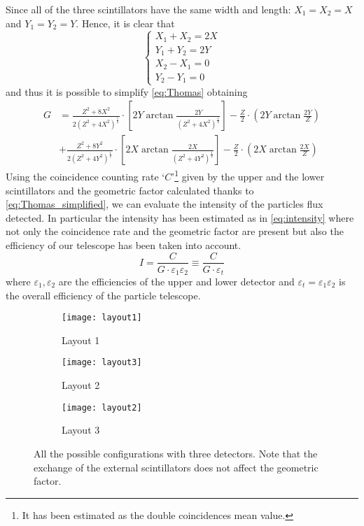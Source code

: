 Since all of the three scintillators have the same width and length: $X_1 = X_2 = X$ and $Y_1 = Y_2 = Y$. Hence, it is clear that
\begin{equation}
	\begin{cases}\label{eq:condG_simplified}
		X_1 + X_2 = 2X \\
		Y_1 + Y_2 = 2Y \\
		X_2 - X_1 = 0 \\
		Y_2 - Y_1 = 0
	\end{cases}
\end{equation}
and thus it is possible to simplify \eqref{eq:Thomas} obtaining
\begin{align}\label{eq:Thomas_simplified}
	G & = \frac{Z^2 + 8X^2}{2\left( Z^2 + 4X^2 \right) ^{\frac{1}{2}}} \cdot \left[ 2Y\arctan\frac{2Y}{\left( Z^2 + 4X^2 \right)^{\frac{1}{2}}} \right]
	- \frac{Z}{2} \cdot \left( 2Y\arctan\frac{2Y}{Z} \right) \nonumber \\
	& + \frac{Z^2 + 8Y^2}{2\left( Z^2 + 4Y^2 \right) ^{\frac{1}{2}}} \cdot \left[ 2X\arctan\frac{2X}{\left( Z^2 + 4Y^2 \right)^{\frac{1}{2}}} \right]
	- \frac{Z}{2} \cdot \left( 2X\arctan\frac{2X}{Z} \right)
\end{align}
Using the coincidence counting rate `$C$'\footnote{It has been estimated as the double coincidences mean value.} given by the upper and the lower scintillators and the geometric factor calculated thanks to \eqref{eq:Thomas_simplified}, we can evaluate the intensity of the particles flux detected. In particular the intensity has been estimated as in \eqref{eq:intensity} where not only the coincidence rate and the geometric factor are present but also the efficiency of our telescope has been taken into account.
\begin{equation}\label{eq:intensity}
	I = \frac{C}{G\cdot\varepsilon_1 \varepsilon_2} \equiv \frac{C}{G\cdot\varepsilon_t}
\end{equation}
where $\varepsilon_1, \varepsilon_2$ are the efficiencies of the upper and lower detector and $\varepsilon_{t} = \varepsilon_1 \varepsilon_2$ is the overall efficiency of the particle telescope.
\begin{figure}[!htp]
	\centering
	\begin{subfigure}{.3\textwidth}
		\centering
		\texttt{[image: layout1]}
		\caption{Layout 1}\label{subfig:l1}
	\end{subfigure}\hfill
	\begin{subfigure}{.3\textwidth}
		\centering
		\texttt{[image: layout3]}
		\caption{Layout 2}\label{subfig:l2}
	\end{subfigure}\hfill
	\begin{subfigure}{.3\textwidth}
		\centering
		\texttt{[image: layout2]}
		\caption{Layout 3}\label{subfig:l3}
	\end{subfigure}
	\caption{All the possible configurations with three detectors. Note that the exchange of the external scintillators does not affect the geometric factor.}
	\label{fig:telescopes_layout}
\end{figure}
